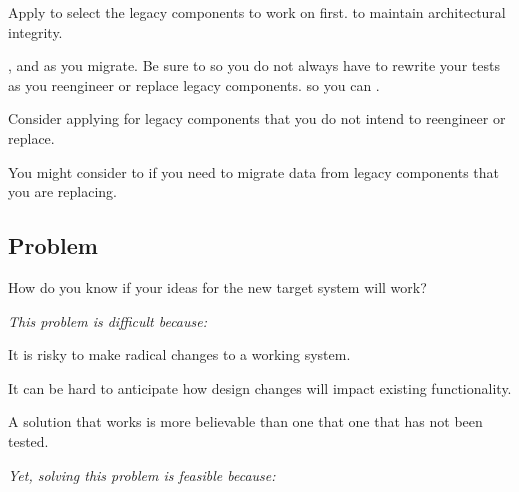 \documentclass[a4paper,10pt,twoside]{book}
\begin{document}
Apply  to select the legacy components to work on first.  to maintain architectural integrity. 

, and  as you migrate. Be sure to  so you do not always have to rewrite your tests as you reengineer or replace legacy components.  so you can .

Consider applying  for legacy components that you do not intend to reengineer or replace.

You might consider to  if you need to migrate data from legacy components that you are replacing.




\subsection*{Problem}

How do you know if your ideas for the new target system will work?

\emph{This problem is difficult because:} 

\begin{bulletlist}
\item It is risky to make radical changes to a working system.

\item It can be hard to anticipate how design changes will impact existing functionality.

\item A solution that works is more believable than one that one that has not been tested.
\end{bulletlist}

\emph{Yet, solving this problem is feasible because:}
\end{document}
